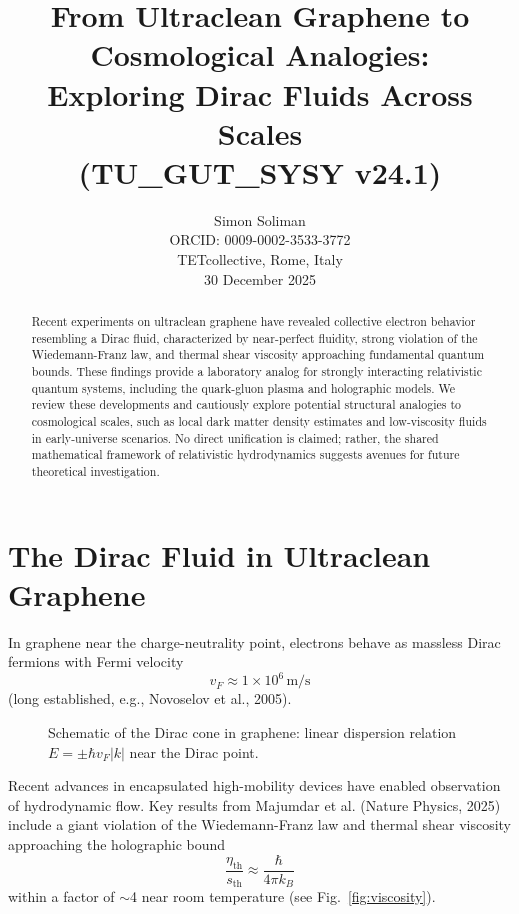 \documentclass[11pt,a4paper]{article}
\title{From Ultraclean Graphene to Cosmological Analogies:\\ Exploring Dirac Fluids Across Scales\\ (TU\_GUT\_SYSY v24.1)}
\author{Simon Soliman\\
ORCID: 0009-0002-3533-3772\\  %
TETcollective, Rome, Italy\\
30 December 2025}
\date{}
\begin{document}
\maketitle

\begin{abstract}
Recent experiments on ultraclean graphene have revealed collective electron behavior resembling a Dirac fluid, characterized by near-perfect fluidity, strong violation of the Wiedemann-Franz law, and thermal shear viscosity approaching fundamental quantum bounds. These findings provide a laboratory analog for strongly interacting relativistic quantum systems, including the quark-gluon plasma and holographic models. We review these developments and cautiously explore potential structural analogies to cosmological scales, such as local dark matter density estimates and low-viscosity fluids in early-universe scenarios. No direct unification is claimed; rather, the shared mathematical framework of relativistic hydrodynamics suggests avenues for future theoretical investigation.
\end{abstract}

\section{The Dirac Fluid in Ultraclean Graphene}

In graphene near the charge-neutrality point, electrons behave as massless Dirac fermions with Fermi velocity
\[
v_F \approx 1 \times 10^6 \, \mathrm{m/s}
\]
(long established, e.g., Novoselov et al., 2005)\cite{novoselov2005}.

\begin{figure}[!htbp]
\centering
{}
\caption{Schematic of the Dirac cone in graphene: linear dispersion relation $E = \pm \hbar v_F |k|$ near the Dirac point.}
\label{fig:diraccone}
\end{figure}

Recent advances in encapsulated high-mobility devices have enabled observation of hydrodynamic flow. Key results from Majumdar et al. (Nature Physics, 2025) include a giant violation of the Wiedemann-Franz law and thermal shear viscosity approaching the holographic bound
\[
\frac{\eta_\mathrm{th}}{s_\mathrm{th}} \approx \frac{\hbar}{4\pi k_B}
\]
within a factor of $\sim$4 near room temperature (see Fig.~\ref{fig:viscosity})\cite{majumdar2025}.
\end{document}
